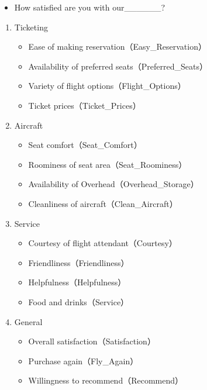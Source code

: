 \documentclass[12pt,]{krantz}
\providecommand{\tightlist}{%
  \setlength{\itemsep}{0pt}\setlength{\parskip}{0pt}}
\begin{document}
\begin{itemize}
\tightlist
\item
  How satisfied are you with our\_\_\_\_\_\_?
\end{itemize}

\begin{enumerate}
\def\labelenumi{\arabic{enumi}.}
\tightlist
\item
  Ticketing

  \begin{itemize}
  \tightlist
  \item
    Ease of making reservation（Easy\_Reservation）
  \item
    Availability of preferred seats（Preferred\_Seats）
  \item
    Variety of flight options（Flight\_Options）
  \item
    Ticket prices（Ticket\_Prices）
  \end{itemize}
\item
  Aircraft

  \begin{itemize}
  \tightlist
  \item
    Seat comfort（Seat\_Comfort）
  \item
    Roominess of seat area（Seat\_Roominess）
  \item
    Availability of Overhead（Overhead\_Storage）
  \item
    Cleanliness of aircraft（Clean\_Aircraft）
  \end{itemize}
\item
  Service

  \begin{itemize}
  \tightlist
  \item
    Courtesy of flight attendant（Courtesy）
  \item
    Friendliness（Friendliness）
  \item
    Helpfulness（Helpfulness）
  \item
    Food and drinks（Service）
  \end{itemize}
\item
  General

  \begin{itemize}
  \tightlist
  \item
    Overall satisfaction（Satisfaction）
  \item
    Purchase again（Fly\_Again）
  \item
    Willingness to recommend（Recommend）
  \end{itemize}
\end{enumerate}
\end{document}
